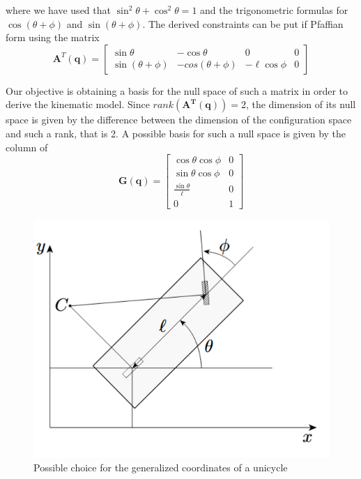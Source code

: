 where we have used that $\sin^2\theta+\cos^2\theta=1$ and the trigonometric formulas for $\cos(\theta+\phi)$ and $\sin(\theta+\phi)$. The derived constraints can be put if Pfaffian form using the matrix
\begin{equation}
    \mathbf{A}^T(\mathbf{q})=\begin{bmatrix}
        \sin\theta&-\cos\theta&0&0\\
        \sin(\theta+\phi)&-cos(\theta+\phi)&-\ell\cos\phi&0
    \end{bmatrix}
\end{equation}
\newpage
\begin{multicols}{2}

Our objective is obtaining a basis for the null space of such a matrix in order to derive the kinematic model. Since $rank(\mathbf{A^T(q)})=2$, the dimension of its null space is given by the difference between the dimension of the configuration space and such a rank, that is 2. A possible basis for such a null space is given by the column of
\begin{equation}
    \mathbf{G(q)}=\begin{bmatrix}
        \cos\theta\cos\phi&0\\
        \sin\theta\cos\phi&0\\
        \frac{\sin\theta}{\ell}&0\\
        0&1
    \end{bmatrix}
\end{equation}
\begin{figure}[H]
    \centering
    \includegraphics[scale=0.6]{img/bicycle_scheme.png}
    \caption{Possible choice for the generalized coordinates of a unicycle}    
    \label{fig:scheme_bicycle}
\end{figure}
\end{multicols}
